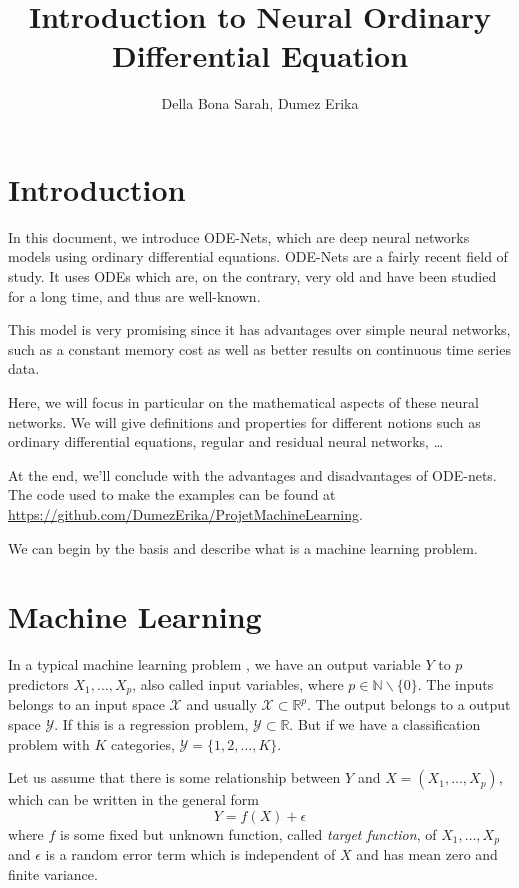 \documentclass[10pt,a4paper]{article}
\author{Della Bona Sarah, Dumez Erika}
\title{Introduction to Neural Ordinary Differential Equation}
\theoremstyle{definition}
\theoremstyle{plain}
\begin{document}
\maketitle

\newpage
\tableofcontents

\newpage
\section{Introduction}

In this document, we introduce ODE-Nets, which are deep neural networks models using ordinary differential equations. 
ODE-Nets are a fairly recent field of study. It uses ODEs which are, on the contrary, very old and have been studied for a long time, and thus are well-known. 

This model is very promising since it has advantages over simple neural networks, such as a constant memory cost as well as better results on continuous time series data.

Here, we will focus in particular on the mathematical aspects of these neural networks. We will give definitions and properties for different notions such as ordinary differential equations, regular and residual neural networks, \dots

At the end, we'll conclude with the advantages and disadvantages of ODE-nets.
The code used to make the examples can be found at \url{https://github.com/DumezErika/ProjetMachineLearning}.

We can begin by the basis and describe what is a machine learning problem.

\section{Machine Learning}
In a typical machine learning problem \cite{7}, we have an output variable $Y$ to $p$ predictors $X_1,\dots, X_p$, also called input variables, where $p\in \mathbb{N}\backslash \{0\}$. The inputs belongs to an input space $\mathcal{X}$ and usually $\mathcal{X} \subset \mathbb{R}^p$. The output belongs to a output space $\mathcal{Y}$. If this is a regression problem, $\mathcal{Y} \subset \mathbb{R}$. But if we have a classification problem with $K$ categories, $\mathcal{Y} = \{1,2,\dots, K\}$.

Let us assume that there is some relationship between $Y$ and $X = (X_1,\dots, X_p)$, which can be written in the general form
$$
Y = f(X) + \epsilon
$$
where $f$ is some fixed but unknown function, called \textit{target function}, of $X_1, \dots, X_p$ and $\epsilon$ is a random error term which is independent of $X$ and has mean zero and finite variance.
\end{document}
